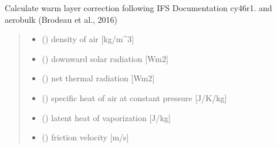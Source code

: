 \documentclass[letterpaper,10pt,english]{sphinxmanual}
\begin{document}
\begin{fulllineitems}
\label{\detokenize{users_guide:cs_wl_subs.wl_ecmwf}}
\pysigstartsignatures
{}
\pysigstopsignatures
\sphinxAtStartPar
Calculate warm layer correction following IFS Documentation cy46r1.
and aerobulk (Brodeau et al., 2016)
\begin{quote}\begin{description}
\begin{itemize}
\item {} 
\sphinxAtStartPar
{} () \textendash{} density of air               {[}kg/m\textasciicircum{}3{]}

\item {} 
\sphinxAtStartPar
{} () \textendash{} downward solar radiation    {[}Wm\sphinxhyphen{}2{]}

\item {} 
\sphinxAtStartPar
{} () \textendash{} net thermal radiation  {[}Wm\sphinxhyphen{}2{]}

\item {} 
\sphinxAtStartPar
{} () \textendash{} specific heat of air at constant pressure {[}J/K/kg{]}

\item {} 
\sphinxAtStartPar
{} () \textendash{} latent heat of vaporization   {[}J/kg{]}

\item {} 
\sphinxAtStartPar
{} () \textendash{} friction velocity           {[}m/s{]}


\end{itemize}
\end{description}
\end{quote}
\end{fulllineitems}
\end{document}
